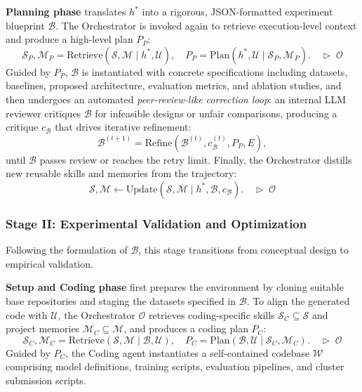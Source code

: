 \documentclass{opendatalab}
\begin{document}
\noindent\textbf{Planning phase} translates $h^*$ into a rigorous, JSON-formatted experiment blueprint $\mathcal{B}$. The Orchestrator is invoked again to retrieve execution-level context and produce a high-level plan $P_P$:
\begin{equation}
    \mathcal{S}_P, \mathcal{M}_P = \text{Retrieve}(\mathcal{S}, \mathcal{M} \mid h^*, \mathcal{U}), \quad P_{P} = \text{Plan}(h^*, \mathcal{U} \mid \mathcal{S}_P, \mathcal{M}_P). \quad \triangleright\;\mathcal{O}
\end{equation}
Guided by $P_{P}$, $\mathcal{B}$ is instantiated with concrete specifications including datasets, baselines, proposed architecture, evaluation metrics, and ablation studies, and then undergoes an automated \textit{peer-review-like correction loop}: an internal LLM reviewer critiques $\mathcal{B}$ for infeasible designs or unfair comparisons, producing a critique $c_{\mathcal{B}}$ that drives iterative refinement:
\begin{equation}
    \mathcal{B}^{(t+1)} = \text{Refine}(\mathcal{B}^{(t)}, c_{\mathcal{B}}^{(t)}, P_{P}, E),
\end{equation}
until $\mathcal{B}$ passes review or reaches the retry limit. Finally, the Orchestrator distills new reusable skills and memories from the trajectory:
\begin{equation}
    \mathcal{S}, \mathcal{M} \leftarrow \text{Update}(\mathcal{S}, \mathcal{M} \mid h^*, \mathcal{B}, c_{\mathcal{B}}). \quad \triangleright\;\mathcal{O}
\end{equation}

\subsubsection{Stage II: Experimental Validation and Optimization}

Following the formulation of $\mathcal{B}$, this stage transitions from conceptual design to empirical validation. 

\noindent\textbf{Setup and Coding phase} first prepares the environment by cloning suitable base repositories and staging the datasets specified in $\mathcal{B}$. To align the generated code with $\mathcal{U}$, the Orchestrator $\mathcal{O}$ retrieves coding-specific skills $\mathcal{S}_C \subseteq \mathcal{S}$ and project memories $\mathcal{M}_C \subseteq \mathcal{M}$, and produces a coding plan $P_C$:
\begin{equation}
    \mathcal{S}_C, \mathcal{M}_C = \text{Retrieve}(\mathcal{S}, \mathcal{M} \mid \mathcal{B}, \mathcal{U}), \quad P_{C} = \text{Plan}(\mathcal{B}, \mathcal{U} \mid \mathcal{S}_C, \mathcal{M}_C). \quad \triangleright\;\mathcal{O}
\end{equation}
Guided by $P_C$, the Coding agent instantiates a self-contained codebase $\mathcal{W}$ comprising model definitions, training scripts, evaluation pipelines, and cluster submission scripts.
\end{document}
